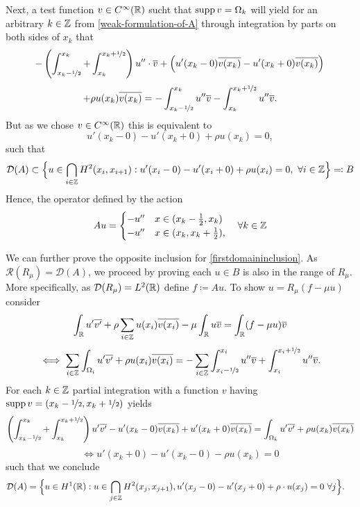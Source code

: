 Next, a test function $v \in C^{\infty}(\mathbb{R})$ sucht that $\operatorname{supp} v = \Omega_{k}$ will yield for an arbitrary $k \in \mathbb{Z}$ from \eqref{weak-formulation-of-A}   through integration by parts on both sides of $x_{k}$ that
	\[ -\left( \int_{x_{k}-\nicefrac{1}{2}}^{x_{k}} + \int_{x_{k}}^{x_{k} + \nicefrac{1}{2}}\right) u'' \cdot \overline{v} + \left( u'(x_{k}-0) \overline{v(x_{k})} - u'(x_{k} + 0) \overline{v(x_{k})} \right) \\ \]
	\[ +  \rho u(x_{k})\overline{v(x_{k})} = - \int_{x_{k} - \nicefrac{1}{2}}^{x_{k}} u'' \overline{v} - \int_{x_{k}}^{x_{k} + \nicefrac{1}{2}} u'' \overline{v}. \]
But as we chose $v \in C^{\infty}(\mathbb{R})$ this is equivalent to
	\[ u'(x_{k}-0) - u'(x_{k}+0) + \rho u(x_{k}) = 0, \]
such that
	\begin{equation}
		\mathcal{D}(A) \subset \Big\{ u \in \bigcap_{i \in \mathbb{Z}} H^{2}(x_{i}, x_{i + 1}) : u'(x_{i} - 0) - u'(x_{i} + 0) + \rho u(x_{i}) = 0 , ~\forall i \in \mathbb{Z} \Big\} \eqqcolon B \label{firstdomaininclusion}
	\end{equation} 
Hence, the operator defined by the action
	\[ A u = \begin{cases}
					- u'' & x \in (x_{k} - \frac{1}{2}, x_{k}) \\
					- u'' & x \in (x_{k}, x_{k} + \frac{1}{2}),
			 \end{cases} \quad \forall k \in \mathbb{Z} \] %
				
We can further prove the opposite inclusion for \eqref{firstdomaininclusion}. As $\mathcal{R}(R_{\mu}) = \mathcal{D}(A)$, we proceed by proving each $u \in B$ is also in the range of $R_{\mu}$. More specifically, as $\mathcal{D}(R_{\mu}) = L^{2}(\mathbb{R})$ define $f \coloneqq A u$. To show $u = R_{\mu}(f - \mu u)$ consider
	\[ \int_{\mathbb{R}} u' \overline{v'} + \rho \sum_{i \in \mathbb{Z}} u(x_{i}) \overline{v(x_{i})} - \mu \int_{\mathbb{R}} u \overline{v}= \int_{\mathbb{R}}(f-\mu u) \overline{v} \]
	\[ \iff \sum_{i \in \mathbb{Z}} \int_{\Omega_{i}} u' \overline{v'} + \rho u(x_{i}) \overline{v(x_{i})} = - \sum_{i \in \mathbb{Z}} \int_{x_{i} - \nicefrac{1}{2}}^{x_{i}} u'' \overline{v} + \int_{x_{i}}^{x_{i} + \nicefrac{1}{2}} u'' \overline{v}. \]
	For each $k \in \mathbb{Z}$ partial integration with a function $v$ having $\operatorname{supp} v = (x_{k} - \nicefrac{1}{2}, x_{k} + \nicefrac{1}{2})$ yields
	\[ \left( \int_{x_{k} - \nicefrac{1}{2}}^{x_{k}} + \int_{x_{k}}^{x_{k} +\nicefrac{1}{2}} \right) u' \overline{v'} - u'(x_{k}-0) \overline{v(x_{k})}  + u'(x_{k}+0) \overline{v(x_{k})}  = \int_{\Omega_{k}} u' \overline{v'} + \rho u(x_{k}) \overline{v(x_{k})} \]
	\[ \iff u'(x_{k}+0) - u'(x_{k}-0) - \rho u(x_{k}) = 0 \]
	such that we conclude
	\begin{align*}
		\mathcal{D}(A) & = \Big\{ u \in H^{1}(\mathbb{R}): u \in \bigcap_{j \in \mathbb{Z}} H^{2}(x_{j} , x_{j+1}), u'(x_{j} - 0) - u'(x_{j} + 0) + \rho \cdot u(x_{j}) = 0 ~\forall j \Big\}.
	\end{align*}

